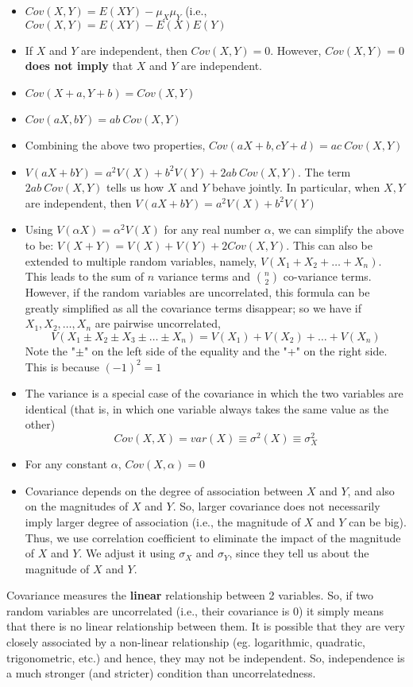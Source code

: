 \begin{itemize}
    \item $Cov(X,Y) = E(XY) - \mu_X \mu_Y$ (i.e., $Cov(X,Y) = E(XY) - E(X) E(Y)$
    \item If $X$ and $Y$ are independent, then $Cov(X,Y) = 0$. However, $Cov(X,Y) = 0 $  \textbf{does not imply} that $X$ and $Y$ are independent.
    \item $Cov(X + a, Y + b) = Cov(X,Y)$
    \item $Cov(aX, bY) = ab\ Cov(X,Y)$
    \item Combining the above two properties, $Cov(aX + b, cY + d) = ac\ Cov(X,Y)$
    \item $V(aX + bY) = a^2V(X) + b^2V(Y) + 2ab\ Cov(X,Y)$. The term $ 2ab\ Cov(X,Y)$ tells us how $X$ and $Y$ behave jointly. In particular, when $X,Y$ are independent, then $V(aX + bY) = a^2V(X) + b^2V(Y)$
    \item Using $V(\alpha X) = \alpha^2V(X)$ for any real number $\alpha$, we can simplify the above to be: $V(X + Y) = V(X) + V(Y) + 2Cov(X,Y)$. This can also be extended to multiple random variables, namely, $V(X_1 + X_2 + \dots + X_n)$. This leads to the sum of $n$ variance terms and $\binom{n}{2}$ co-variance terms. However, if the random variables are uncorrelated, this formula can be greatly simplified as all the covariance terms disappear; so we have if $X_1, X_2, \dots, X_n$ are pairwise uncorrelated,
    $$
    V(X_1 \pm X_2 \pm X_3 \pm \dots \pm X_n) = V(X_1) + V(X_2) + \dots + V(X_n)
    $$
    Note the "$\pm$" on the left side of the equality and the "+" on the right side. This is because $(-1)^2 = 1$
    \item The variance is a special case of the covariance in which the two variables are identical (that is, in which one variable always takes the same value as the other)
    $$
    Cov(X,X) = var(X) \equiv \sigma^2(X) \equiv \sigma^2_X
    $$
    \item For any constant $\alpha$, $Cov(X, \alpha) = 0$
    \item Covariance depends on the degree of association between $X$ and $Y$, and also on the magnitudes of $X$ and $Y$. So, larger covariance does not necessarily imply larger degree of association (i.e., the magnitude of $X$ and $Y$ can be big). Thus, we use correlation coefficient to eliminate the impact of the magnitude of $X$ and $Y$. We adjust it using $\sigma_X$ and $\sigma_Y$, since they tell us about the magnitude of $X$ and $Y$.
\end{itemize}
Covariance measures the \textbf{linear} relationship between 2 variables. So, if two random variables are uncorrelated (i.e., their covariance is 0) it simply means that there is no linear relationship between them. It is possible that they are very closely associated by a non-linear relationship (eg. logarithmic, quadratic, trigonometric, etc.) and hence, they may not be independent. So, independence is a much stronger (and stricter) condition than uncorrelatedness.

